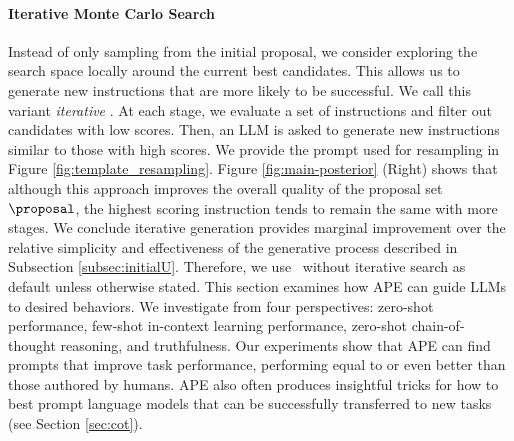 \paragraph{Iterative Monte Carlo Search}
Instead of only sampling from the initial proposal, we consider exploring the search space locally around the current best candidates. This allows us to generate new instructions that are more likely to be successful. We call this variant \textit{iterative \algname}. 
At each stage, we evaluate a set of instructions and filter out candidates with low scores. Then, an LLM is asked to generate new instructions similar to those with high scores. We provide the prompt used for resampling in Figure \ref{fig:template_resampling}. 
Figure \ref{fig:main-posterior} (Right) shows that although this approach improves the overall quality of the proposal set $\proposal$, the highest scoring instruction tends to remain the same with more stages. We conclude iterative generation provides marginal improvement over the relative simplicity and effectiveness of the generative process described in Subsection \ref{subsec:initialU}. Therefore, we use \algname~without iterative search as default unless otherwise stated.
This section examines how APE can guide LLMs to desired behaviors. We investigate from four perspectives: zero-shot performance, few-shot in-context learning performance, zero-shot chain-of-thought reasoning, and truthfulness. Our experiments show that APE can find prompts that improve task performance, performing equal to or even better than those authored by humans. APE also often produces insightful tricks for how to best prompt language models that can be successfully transferred to new tasks (see Section \ref{sec:cot}).

